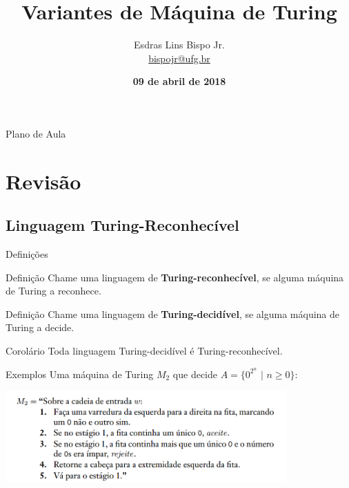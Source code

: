 \documentclass[xcolor=dvipsnames,table]{beamer}
\title{Variantes de Máquina de Turing}
\author{
  Esdras Lins Bispo Jr. \\ \url{bispojr@ufg.br}
  }
\institute{
  Teoria da Computação \\Bacharelado em Ciência da Computação}
\date{\textbf{09 de abril de 2018} }
\begin{document}
	\begin{frame}
		\titlepage
	\end{frame}

	\AtBeginSection{
		\begin{frame}{Sumário}%
    		\tableofcontents[currentsection]
		\end{frame}
	}

	\begin{frame}{Plano de Aula}
		\tableofcontents
	\end{frame}
	
	
	\section{Revisão}
	\subsection{Linguagem Turing-Reconhecível}	
	\begin{frame}{Definições}
		\begin{block}{Definição}
			Chame uma linguagem de {\bf Turing-reconhecível}, se alguma máquina de Turing a reconhece.
		\end{block}        
		\begin{block}{Definição}
			Chame uma linguagem de {\bf Turing-decidível}, se alguma máquina de Turing a decide.
		\end{block}       
		\begin{block}{Corolário}
			Toda linguagem Turing-decidível é Turing-reconhecível.
		\end{block}
	\end{frame}		
	
	\begin{frame}{Exemplos}
		Uma máquina de Turing $M_2$ que decide $A = \{ 0^{2^n} \mbox{ | } n \geq 0 \}$:  
		\begin{center}
			\includegraphics[height=3.5cm]{images/m2.png}
		\end{center}
	\end{frame}
	
\end{document}
